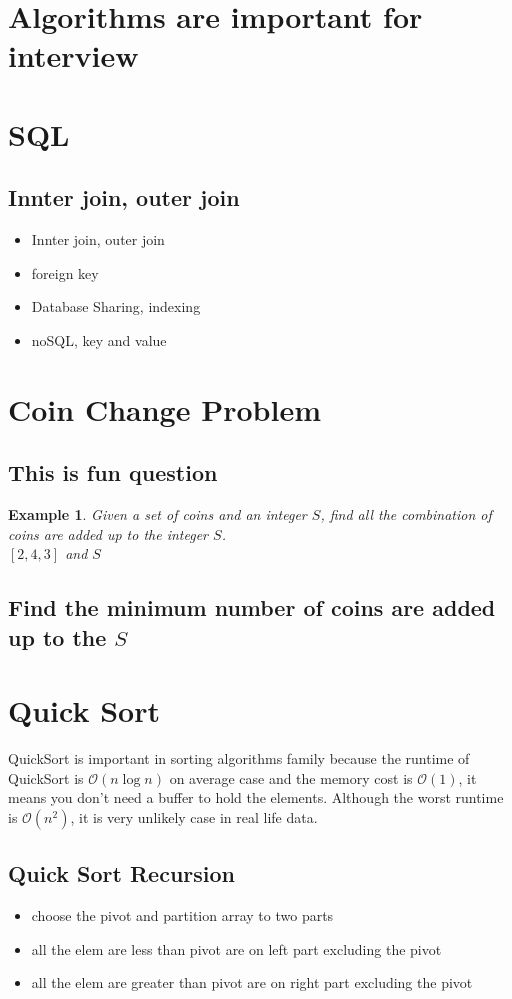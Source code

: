 \documentclass{article}
\newtheorem{example}{Example}
\begin{document}
\section{Algorithms are important for interview}

\section{SQL}
\subsection{Innter join, outer join}
\begin{itemize}
 \item Innter join, outer join 
 \item foreign key
 \item Database Sharing, indexing
 \item noSQL, key and value 
\end{itemize}

\section{Coin Change Problem}
\subsection{This is fun question}
\begin{example}
Given a set of coins and an integer $S$, find all the combination of coins are added up to the integer $S$.\\
$[2, 4, 3]$ and $S$

\subsection{Find the minimum number of coins are added up to the $S$}

\end{example}

\section{Quick Sort}
QuickSort is important in sorting algorithms family because the runtime of QuickSort is
$\mathcal{O}(n\log{}n)$ on average case and the memory cost is $\mathcal{O}(1)$, it means you don't need a buffer to hold the elements.
Although the worst runtime is $\mathcal{O}(n^2)$, it is very unlikely case in real life data.
\subsection{Quick Sort Recursion}
\begin{itemize}
 \item[] choose the pivot and partition array to two parts 
 \item[] all the elem are less than pivot are on left part excluding the pivot
 \item[] all the elem are greater than pivot are on right part excluding the pivot
\end{itemize}
\pagebreak
\end{document}
